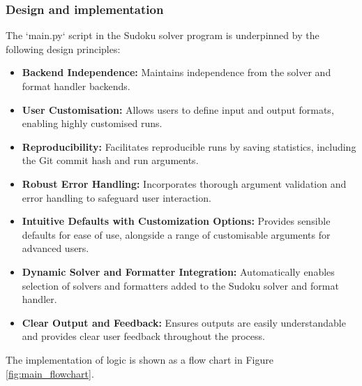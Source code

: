\documentclass[11pt]{article}
\begin{document}
\begin{itemize}
\subsubsection{Design and implementation}
The `main.py` script in the Sudoku solver program is underpinned by the following design principles:

\begin{itemize}
    \item \textbf{Backend Independence:} Maintains independence from the solver and format handler backends.
    \item \textbf{User Customisation:} Allows users to define input and output formats, enabling highly customised runs.
    \item \textbf{Reproducibility:} Facilitates reproducible runs by saving statistics, including the Git commit hash and run arguments.
    \item \textbf{Robust Error Handling:} Incorporates thorough argument validation and error handling to safeguard user interaction.
    \item \textbf{Intuitive Defaults with Customization Options:} Provides sensible defaults for ease of use, alongside a range of customisable arguments for advanced users.
    \item \textbf{Dynamic Solver and Formatter Integration:} Automatically enables selection of solvers and formatters added to the Sudoku solver and format handler.
    \item \textbf{Clear Output and Feedback:} Ensures outputs are easily understandable and provides clear user feedback throughout the process.
\end{itemize}

The implementation of logic is shown as a flow chart in Figure \ref{fig:main_flowchart}.


\end{itemize}
\end{document}
